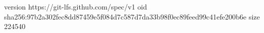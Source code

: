 version https://git-lfs.github.com/spec/v1
oid sha256:97b2a302fec8dd87459e5f084d7c587d7da33b98f0ec89feed99c41efe200b6e
size 224540
